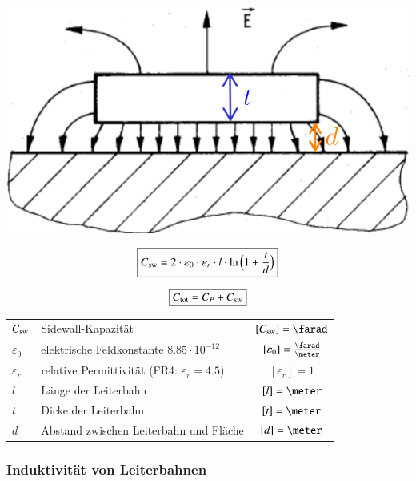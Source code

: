 \begin{minipage}[c]{0.28\columnwidth}
    \includegraphics[width=\columnwidth]{images/kapazitaet_leiterbahn_plane.png}
\end{minipage}
\hfill
\begin{minipage}[c]{0.45\columnwidth}
    $$ \boxed{C_{\rm sw} = 2 \cdot \varepsilon_0 \cdot \varepsilon_r \cdot l \cdot \ln \Big( 1 + \frac{t}{d} \Big) } $$
\end{minipage}
\hfill
\begin{minipage}[c]{0.23\columnwidth}
    $$ \boxed{C_{\rm tot} = C_P + C_{\rm sw}} $$
\end{minipage}

\begin{tabular}{llc}
    $C_{\rm sw}$    & Sidewall-Kapazität                                & $[C_{\rm sw}] = \farad$ \\
    $\varepsilon_0$ & elektrische Feldkonstante $8.85 \cdot 10^{-12}$   & $[\varepsilon_0] = \frac{\farad}{\meter}$ \\
    $\varepsilon_r$ & relative Permittivität (FR4: $\varepsilon_r= 4.5$)& $[\varepsilon_r] = 1$ \\
    $l$             & Länge der Leiterbahn                              & $[l] = \meter$ \\
    $t$             & Dicke der Leiterbahn                              & $[t] = \meter$ \\
    $d$             & Abstand zwischen Leiterbahn und Fläche            & $[d] = \meter$
\end{tabular}



\subsubsection{Induktivität von Leiterbahnen}

